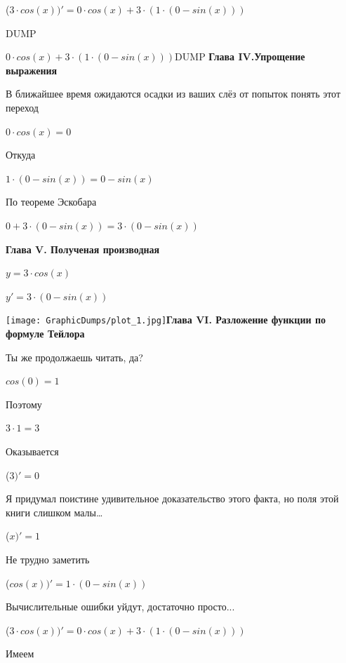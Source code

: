 \documentclass[12pt,a4paper,fleqn]{article}
\begin{document}
\begin{center}
 ($3 \cdot cos(x))'
  = 0 \cdot cos(x)+3 \cdot (1 \cdot (0-sin(x)))$\end{center}
DUMP

$0 \cdot cos(x)+3 \cdot (1 \cdot (0-sin(x)))$DUMP
\newpage \textbf{\LARGE{Глава IV.Упрощение выражения}}

В ближайшее время ожидаются осадки из ваших слёз от попыток понять этот переход

\begin{center}
$0 \cdot cos(x) = 0$\end{center}
Откуда

\begin{center}
$1 \cdot (0-sin(x)) = 0-sin(x)$\end{center}
По теореме Эскобара

\begin{center}
$0+3 \cdot (0-sin(x)) = 3 \cdot (0-sin(x))$\end{center}
\newpage \textbf{\LARGE{Глава V. Полученая производная}}

$y = $$3 \cdot cos(x)$

$y' = $$3 \cdot (0-sin(x))$

\texttt{[image: GraphicDumps/plot\_1.jpg]}\newpage \textbf{\LARGE{Глава VI. Разложение функции по формуле Тейлора}}

Ты же продолжаешь читать, да?

\begin{center}$cos(0) = 1$\end{center}
Поэтому

\begin{center}$3 \cdot 1 = 3$\end{center}
Оказывается

\begin{center}
 ($3)'
  = 0$\end{center}
Я придумал поистине удивительное доказательство этого факта, но поля этой книги слишком малы\ldots

\begin{center}
 ($x)'
  = 1$\end{center}
Не трудно заметить

\begin{center}
 ($cos(x))'
  = 1 \cdot (0-sin(x))$\end{center}
Вычислительные ошибки уйдут, достаточно просто...

\begin{center}
 ($3 \cdot cos(x))'
  = 0 \cdot cos(x)+3 \cdot (1 \cdot (0-sin(x)))$\end{center}
Имеем
\end{document}
